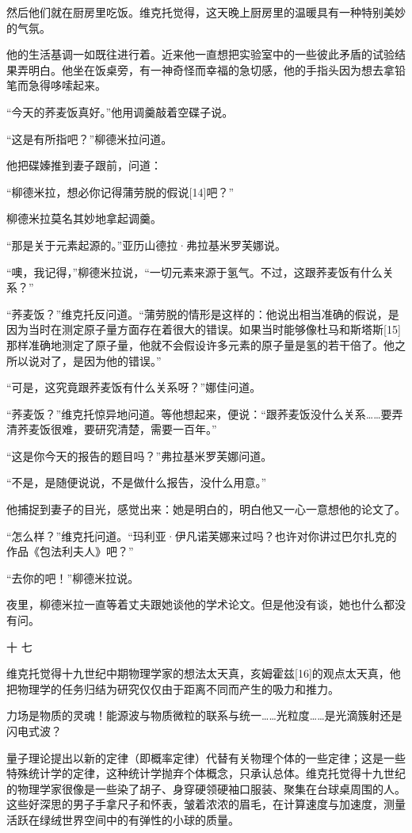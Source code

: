 然后他们就在厨房里吃饭。维克托觉得，这天晚上厨房里的温暖具有一种特别美妙的气氛。

他的生活基调一如既往进行着。近来他一直想把实验室中的一些彼此矛盾的试验结果弄明白。他坐在饭桌旁，有一神奇怪而幸福的急切感，他的手指头因为想去拿铅笔而急得哆嗦起来。

“今天的荞麦饭真好。”他用调羹敲着空碟子说。

“这是有所指吧？”柳德米拉问道。

他把碟嫀推到妻子跟前，问道：

“柳德米拉，想必你记得蒲劳脱的假说[14]吧？”

柳德米拉莫名其妙地拿起调羹。

“那是关于元素起源的。”亚历山德拉·弗拉基米罗芙娜说。

“噢，我记得，”柳德米拉说，“一切元素来源于氢气。不过，这跟荞麦饭有什么关系？”

“荞麦饭？”维克托反问道。“蒲劳脱的情形是这样的：他说出相当准确的假说，是因为当时在测定原子量方面存在着很大的错误。如果当时能够像杜马和斯塔斯[15]那样准确地测定了原子量，他就不会假设许多元素的原子量是氢的若干倍了。他之所以说对了，是因为他的错误。”

“可是，这究竟跟荞麦饭有什么关系呀？”娜佳问道。

“荞麦饭？”维克托惊异地问道。等他想起来，便说：“跟荞麦饭没什么关系……要弄清荞麦饭很难，要研究清楚，需要一百年。”

“这是你今天的报告的题目吗？”弗拉基米罗芙娜问道。

“不是，是随便说说，不是做什么报告，没什么用意。”

他捕捉到妻子的目光，感觉出来：她是明白的，明白他又一心一意想他的论文了。

“怎么样？”维克托问道。“玛利亚·伊凡诺芙娜来过吗？也许对你讲过巴尔扎克的作品《包法利夫人》吧？”

“去你的吧！”柳德米拉说。

夜里，柳德米拉一直等着丈夫跟她谈他的学术论文。但是他没有谈，她也什么都没有问。

十 七

维克托觉得十九世纪中期物理学家的想法太天真，亥姆霍兹[16]的观点太天真，他把物理学的任务归结为研究仅仅由于距离不同而产生的吸力和推力。

力场是物质的灵魂！能源波与物质微粒的联系与统一……光粒度……是光滴簇射还是闪电式波？

量子理论提出以新的定律（即概率定律）代替有关物理个体的一些定律；这是一些特殊统计学的定律，这种统计学抛弃个体概念，只承认总体。维克托觉得十九世纪的物理学家很像是一些染了胡子、身穿硬领硬袖口服装、聚集在台球桌周围的人。这些好深思的男子手拿尺子和怀表，皱着浓浓的眉毛，在计算速度与加速度，测量活跃在绿绒世界空间中的有弹性的小球的质量。

